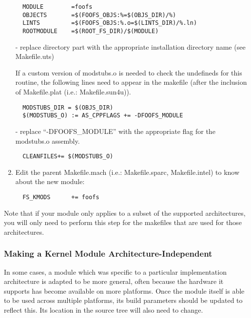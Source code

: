 \documentclass{article}
\begin{document}
\begin{enumerate}
\begin{verbatim}
  MODULE        =foofs
  OBJECTS       =$(FOOFS_OBJS:%=$(OBJS_DIR)/%)
  LINTS         =$(FOOFS_OBJS:%.o=$(LINTS_DIR)/%.ln)
  ROOTMODULE    =$(ROOT_FS_DIR)/$(MODULE)
\end{verbatim}


  \vspace{0.1cm}
  - replace directory part with the appropriate installation directory name (see
  Makefile.uts)

  If a custom version of modstubs.o is needed to check the undefineds for this
  routine, the following lines need to appear in the makefile (after the
  inclusion of Makefile.plat (i.e.: Makefile.sun4u)).

\begin{verbatim}
  MODSTUBS_DIR = $(OBJS_DIR)
  $(MODSTUBS_O) := AS_CPPFLAGS += -DFOOFS_MODULE
\end{verbatim}

  - replace ``-DFOOFS\_MODULE'' with the appropriate flag for the modstubs.o
  assembly.

\begin{verbatim}
  CLEANFILES+= $(MODSTUBS_O)
\end{verbatim}

\item Edit the parent Makefile.mach (i.e.: Makefile.sparc, Makefile.intel) to know
  about the new module:

\begin{verbatim}
  FS_KMODS      += foofs
\end{verbatim}

\end{enumerate}

Note that if your module only applies to a subset of the supported
architectures, you will only need to perform this step for the makefiles that
are used for those architectures.


\subsubsection*{Making a Kernel Module Architecture-Independent}

In some cases, a module which was specific to a particular implementation
architecture is adapted to be more general, often because the hardware it
supports has become available on more platforms. Once the module itself is able
to be used across multiple platforms, its build parameters should be updated to
reflect this. Its location in the source tree will also need to change.
\end{document}
